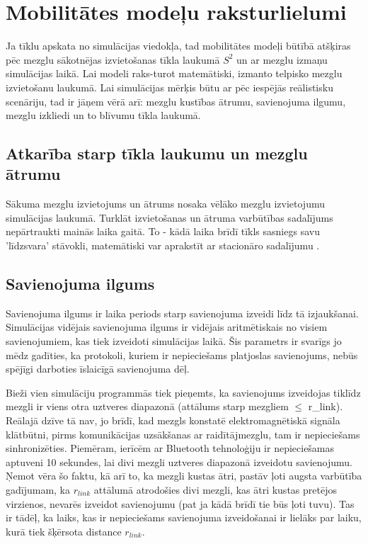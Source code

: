\section{Mobilitātes modeļu raksturlielumi}
Ja tīklu apskata no simulācijas viedokļa, tad mobilitātes modeļi būtībā atšķiras pēc mezglu sākotnējas izvietošanas tīkla laukumā $S^{2}$ un ar mezglu izmaņu simulācijas laikā. Lai modeli raks-turot matemātiski, izmanto telpisko mezglu izvietošanu laukumā. Lai simulācijas mērķis būtu ar pēc iespējās reālistisku scenāriju, tad ir jāņem vērā arī: mezglu kustības ātrumu, savienojuma ilgumu, mezglu izkliedi un to blīvumu tīkla laukumā.

\subsection{Atkarība starp tīkla laukumu un mezglu ātrumu}
Sākuma mezglu izvietojums un ātrums nosaka vēlāko mezglu izvietojumu simulācijas laukumā. Turklāt izvietošanas un ātruma varbūtības sadalījums nepārtraukti mainās laika gaitā. To - kādā laika brīdī tīkls sasniegs savu 'līdzsvara' stāvokli, matemātiski var aprakstīt ar stacionāro sadalījumu \cite{navid}.

\subsection{Savienojuma ilgums}
Savienojuma ilgums ir laika periods starp savienojuma izveidi līdz tā izjaukšanai. Simulācijas vidējais savienojuma ilgums ir vidējais aritmētiskais no visiem savienojumiem, kas tiek izveidoti simulācijas laikā. Šis parametrs ir svarīgs jo mēdz gadīties, ka protokoli, kuriem ir nepieciešams platjoslas savienojums, nebūs spējīgi darboties īslaicīgā savienojuma dēļ.

Bieži vien simulāciju programmās tiek pieņemts, ka savienojums izveidojas tiklīdz mezgli ir viens otra uztveres diapazonā (attālums starp mezgliem $\leq$ \gls{r_link}). Reālajā dzīve tā nav, jo brīdī, kad mezgls konstatē elektromagnētiskā signāla klātbūtni, pirms komunikācijas uzsākšanas ar raidītājmezglu,  tam ir nepieciešams sinhronizēties. Piemēram, ierīcēm ar Bluetooth tehnoloģiju ir nepieciešamas aptuveni 10 sekundes, lai divi mezgli uztveres diapazonā izveidotu savienojumu. Ņemot vēra šo faktu, kā arī to, ka mezgli kustas ātri, pastāv ļoti augsta varbūtība gadījumam, ka $r_{link}$ attālumā atrodošies divi mezgli, kas ātri kustas pretējos virzienos, nevarēs izveidot savienojumu (pat ja kādā brīdī tie būs ļoti tuvu). Tas ir tādēļ, ka laiks, kas ir nepieciešams savienojuma izveidošanai ir lielāks par laiku, kurā tiek šķērsota distance $r_{link}$.

